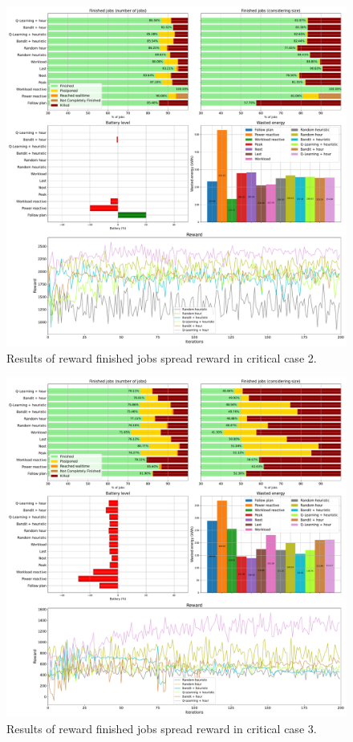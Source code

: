 \begin{figure}[!htb]
    \centering
    \includegraphics[scale=0.29]{Images/Learning_compensations/reward_finished_spread_profile_best_workload_2_with_noise_state_delta.pdf}
    \caption{Results of reward finished jobs spread reward in critical case 2.}
    \label{fig:spread_reward_results_critical_2}
\end{figure}

\begin{figure}[!htb]
    \centering
    \includegraphics[scale=0.29]{Images/Learning_compensations/reward_finished_spread_profile_worst_workload_1_with_noise_state_delta.pdf}
    \caption{Results of reward finished jobs spread reward in critical case 3.}
    \label{fig:spread_reward_results_critical_3}
\end{figure}

